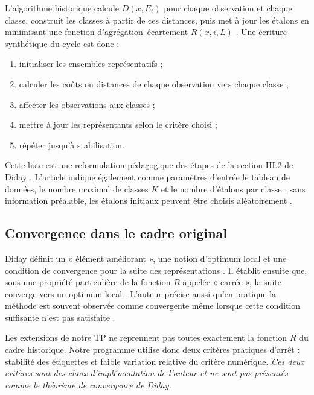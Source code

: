 \documentclass[12pt,a4paper]{article}
\begin{document}
L'algorithme historique calcule $D(x,E_i)$ pour chaque observation et chaque classe, construit les classes à partir de ces distances, puis met à jour les étalons en minimisant une fonction d'agrégation--écartement $R(x,i,L)$ \cite[p.~21]{diday1971}. Une écriture synthétique du cycle est donc :

\begin{enumerate}[label=\arabic*)]
    \item initialiser les ensembles représentatifs ;
    \item calculer les coûts ou distances de chaque observation vers chaque classe ;
    \item affecter les observations aux classes ;
    \item mettre à jour les représentants selon le critère choisi ;
    \item répéter jusqu'à stabilisation.
\end{enumerate}

Cette liste est une reformulation pédagogique des étapes de la section III.2 de Diday \cite[p.~21]{diday1971}. L'article indique également comme paramètres d'entrée le tableau de données, le nombre maximal de classes $K$ et le nombre d'étalons par classe ; sans information préalable, les étalons initiaux peuvent être choisis aléatoirement \cite[p.~23]{diday1971}.

\subsection{Convergence dans le cadre original}

Diday définit un « élément améliorant », une notion d'optimum local et une condition de convergence pour la suite des représentations \cite[p.~22]{diday1971}. Il établit ensuite que, sous une propriété particulière de la fonction $R$ appelée « carrée », la suite converge vers un optimum local \cite[p.~23]{diday1971}. L'auteur précise aussi qu'en pratique la méthode est souvent observée comme convergente même lorsque cette condition suffisante n'est pas satisfaite \cite[p.~23]{diday1971}.

Les extensions de notre TP ne reprennent pas toutes exactement la fonction $R$ du cadre historique. Notre programme utilise donc deux critères pratiques d'arrêt : stabilité des étiquettes et faible variation relative du critère numérique. \textit{Ces deux critères sont des choix d'implémentation de l'auteur et ne sont pas présentés comme le théorème de convergence de Diday.}
\end{document}
